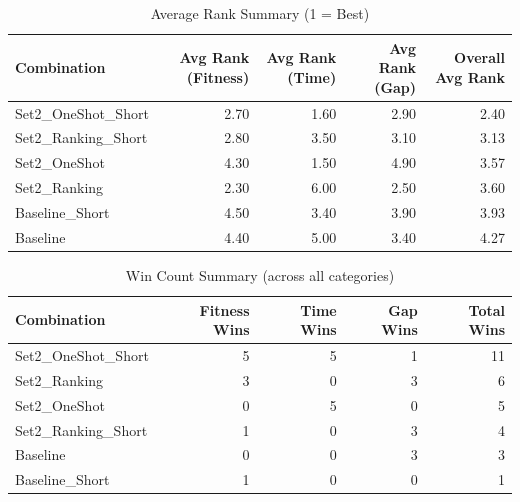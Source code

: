 \documentclass{article}
\begin{document}
\begin{table}[htbp]
\centering
\caption{Average Rank Summary (1 = Best)}
\label{tab:avg_rank_summary}
\begin{tabular}{lrrrr}
\toprule
Combination & Avg Rank (Fitness) & Avg Rank (Time) & Avg Rank (Gap) & Overall Avg Rank \\
\midrule
Set2\_OneShot\_Short & 2.70 & 1.60 & 2.90 & 2.40 \\
Set2\_Ranking\_Short & 2.80 & 3.50 & 3.10 & 3.13 \\
Set2\_OneShot & 4.30 & 1.50 & 4.90 & 3.57 \\
Set2\_Ranking & 2.30 & 6.00 & 2.50 & 3.60 \\
Baseline\_Short & 4.50 & 3.40 & 3.90 & 3.93 \\
Baseline & 4.40 & 5.00 & 3.40 & 4.27 \\
\bottomrule
\end{tabular}
\end{table}

\begin{table}[htbp]
\centering
\caption{Win Count Summary (across all categories)}
\label{tab:win_count_summary}
\begin{tabular}{lrrrr}
\toprule
Combination & Fitness Wins & Time Wins & Gap Wins & Total Wins \\
\midrule
Set2\_OneShot\_Short & 5 & 5 & 1 & 11 \\
Set2\_Ranking & 3 & 0 & 3 & 6 \\
Set2\_OneShot & 0 & 5 & 0 & 5 \\
Set2\_Ranking\_Short & 1 & 0 & 3 & 4 \\
Baseline & 0 & 0 & 3 & 3 \\
Baseline\_Short & 1 & 0 & 0 & 1 \\
\bottomrule
\end{tabular}
\end{table}
\end{document}
